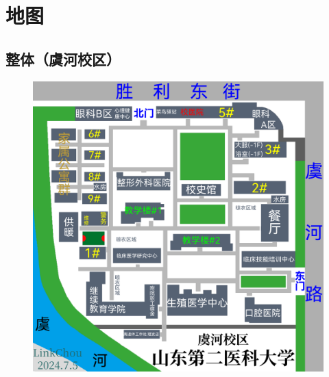 \newpage
\section[地图]{地图\footnotemark}

\subsection[整体（虞河校区）]{整体（虞河校区）}
\begin{figure}[H]
    \centering
    \vspace{4em}
    \includegraphics*[width=\linewidth]{resources/map/虞河校区.pdf}
    \label{map_yuhe_holistic}
\end{figure}

\newpage
